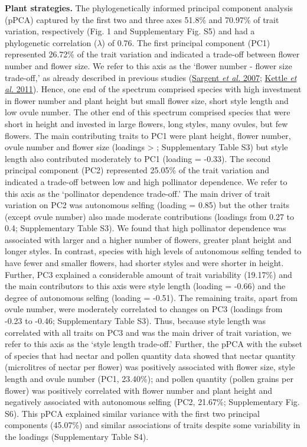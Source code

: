 \documentclass[
  12pt,
  a4paper,
]{article}
\begin{document}
\textbf{Plant strategies.} The phylogenetically informed principal component analysis (pPCA) captured by the first two and three axes 51.8\% and 70.97\% of trait variation, respectively (Fig. 1 and Supplementary Fig. S5) and had a phylogenetic correlation (\(\lambda\)) of 0.76. The first principal component (PC1) represented 26.72\% of the trait variation and indicated a trade-off between flower number and flower size. We refer to this axis as the `flower number - flower size trade-off,' as already described in previous studies (\protect\hyperlink{ref-sargent2007}{Sargent \emph{et al.} 2007}; \protect\hyperlink{ref-kettle2011}{Kettle \emph{et al.} 2011}). Hence, one end of the spectrum comprised species with high investment in flower number and plant height but small flower size, short style length and low ovule number. The other end of this spectrum comprised species that were short in height and invested in large flowers, long styles, many ovules, but few flowers. The main contributing traits to PC1 were plant height, flower number, ovule number and flower size (loadings \textgreater{} \textbar; Supplementary Table S3) but style length also contributed moderately to PC1 (loading = -0.33). The second principal component (PC2) represented 25.05\% of the trait variation and indicated a trade-off between low and high pollinator dependence. We refer to this axis as the `pollinator dependence trade-off.' The main driver of trait variation on PC2 was autonomous selfing (loading = 0.85) but the other traits (except ovule number) also made moderate contributions (loadings from 0.27 to 0.4; Supplementary Table S3). We found that high pollinator dependence was associated with larger and a higher number of flowers, greater plant height and longer styles. In contrast, species with high levels of autonomous selfing tended to have fewer and smaller flowers, had shorter styles and were shorter in height. Further, PC3 explained a considerable amount of trait variability (19.17\%) and the main contributors to this axis were style length (loading = -0.66) and the degree of autonomous selfing (loading = -0.51). The remaining traits, apart from ovule number, were moderately correlated to changes on PC3 (loadings from -0.23 to -0.46; Supplementary Table S3). Thus, because style length was correlated with all traits on PC3 and was the main driver of trait variation, we refer to this axis as the `style length trade-off.' Further, the pPCA with the subset of species that had nectar and pollen quantity data showed that nectar quantity (microlitres of nectar per flower) was positively associated with flower size, style length and ovule number (PC1, 23.40\%); and pollen quantity (pollen grains per flower) was positively correlated with flower number and plant height and negatively associated with autonomous selfing (PC2, 21.67\%; Supplementary Fig. S6). This pPCA explained similar variance with the first two principal components (45.07\%) and similar associations of traits despite some variability in the loadings (Supplementary Table S4).
\end{document}
